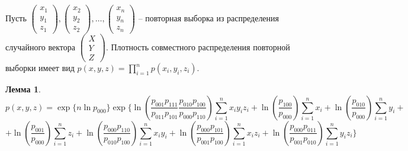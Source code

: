 \documentclass{article}
\theoremstyle{definition}
\newtheorem{lemma}{Лемма}[section]
\begin{document}
Пусть
$
    \begin{pmatrix}
        x_1 \\
        y_1 \\
        z_1
    \end{pmatrix},
    \begin{pmatrix}
        x_2 \\
        y_2 \\
        z_2
    \end{pmatrix}, \ldots,
    \begin{pmatrix}
        x_n \\
        y_n \\
        z_n
    \end{pmatrix}
$ -- повторная выборка из распределения случайного вектора $\begin{pmatrix}
        X \\
        Y \\
        Z
    \end{pmatrix}$.
Плотность совместного распределения повторной выборки имеет вид
$p(x,y,z) = \prod_{i=1}^n p(x_i,y_i,z_i)$.
\begin{lemma}
    $$
        p(x,y,z)= \exp \Biggl\{ n \ln p_{000}\Biggl\}
        \exp \Biggl\{ \ln  \left(\dfrac{p_{001}p_{111}}{p_{011}p_{101}}  \dfrac{p_{010}p_{100}}{p_{000}p_{110}}\right) \sum_{i=1}^n x_i y_i z_i +
        \ln\left(\dfrac{p_{100}}{p_{000}}\right) \sum_{i=1}^{n} x_i + \ln\left(\dfrac{p_{010}}{p_{000}}\right) \sum_{i=1}^{n} y_i +
    $$
    $$
        + \ln\left(\dfrac{p_{001}}{p_{000}}\right) \sum_{i=1}^{n} z_i +\ln \left(\dfrac{p_{000}p_{110}}{p_{010}p_{100}}\right) \sum_{i=1}^n x_i y_i +
        \ln \left(\dfrac{p_{000}p_{101}}{p_{001}p_{100}}\right) \sum_{i=1}^n x_i z_i +
        \ln \left(\dfrac{p_{000}p_{011}}{p_{001}p_{010}}\right) \sum_{i=1}^n y_i z_i \Biggl\}
    $$
\end{lemma}
\end{document}
